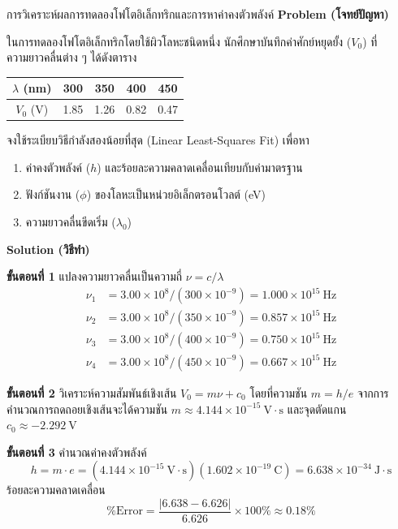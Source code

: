 \begin{psctbox}{การวิเคราะห์ผลการทดลองโฟโตอิเล็กทริกและการหาค่าคงตัวพลังค์}
\textbf{Problem (โจทย์ปัญหา)}

ในการทดลองโฟโตอิเล็กทริกโดยใช้ผิวโลหะชนิดหนึ่ง นักศึกษาบันทึกค่าศักย์หยุดยั้ง ($V_0$) ที่ความยาวคลื่นต่าง ๆ ได้ดังตาราง
\begin{center}
\begin{tabular}{ccccc}
\toprule
$\lambda$ (nm) & 300 & 350 & 400 & 450 \\
\midrule
$V_0$ (V) & 1.85 & 1.26 & 0.82 & 0.47 \\
\bottomrule
\end{tabular}
\end{center}
จงใช้ระเบียบวิธีกำลังสองน้อยที่สุด (Linear Least-Squares Fit) เพื่อหา
\begin{enumerate}
    \item ค่าคงตัวพลังค์ ($h$) และร้อยละความคลาดเคลื่อนเทียบกับค่ามาตรฐาน
    \item ฟังก์ชันงาน ($\phi$) ของโลหะเป็นหน่วยอิเล็กตรอนโวลต์ (eV)
    \item ความยาวคลื่นขีดเริ่ม ($\lambda_0$)
\end{enumerate}

\textbf{Solution (วิธีทำ)}

\textbf{ขั้นตอนที่ 1} แปลงความยาวคลื่นเป็นความถี่ $\nu = c/\lambda$
\begin{align*}
\nu_1 &= 3.00 \times 10^8 / (300 \times 10^{-9}) = 1.000 \times 10^{15}~\text{Hz} \\
\nu_2 &= 3.00 \times 10^8 / (350 \times 10^{-9}) = 0.857 \times 10^{15}~\text{Hz} \\
\nu_3 &= 3.00 \times 10^8 / (400 \times 10^{-9}) = 0.750 \times 10^{15}~\text{Hz} \\
\nu_4 &= 3.00 \times 10^8 / (450 \times 10^{-9}) = 0.667 \times 10^{15}~\text{Hz}
\end{align*}

\textbf{ขั้นตอนที่ 2} วิเคราะห์ความสัมพันธ์เชิงเส้น $V_0 = m \nu + c_0$ โดยที่ความชัน $m = h/e$
จากการคำนวณการถดถอยเชิงเส้นจะได้ความชัน $m \approx 4.144 \times 10^{-15}~\text{V}\cdot\text{s}$ และจุดตัดแกน $c_0 \approx -2.292~\text{V}$

\textbf{ขั้นตอนที่ 3} คำนวณค่าคงตัวพลังค์
\begin{equation*}
h = m \cdot e = (4.144 \times 10^{-15}~\text{V}\cdot\text{s})(1.602 \times 10^{-19}~\text{C}) = 6.638 \times 10^{-34}~\text{J}\cdot\text{s}
\end{equation*}
ร้อยละความคลาดเคลื่อน
\begin{equation*}
\% \text{Error} = \frac{|6.638 - 6.626|}{6.626} \times 100\% \approx 0.18\%
\end{equation*}


\end{psctbox}

